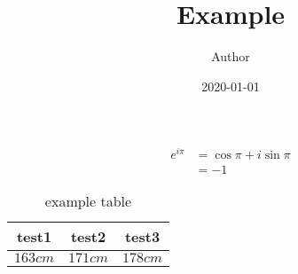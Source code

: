 \documentclass[a4paper,11pt,xelatex,ja=standard]{bxjsarticle}
\title{Example}
\author{Author}
\date{2020-01-01}
\begin{document}
\maketitle
\begin{align}
e^{i\pi} &= \cos{\pi} + i\sin{\pi}\\
&=-1
\end{align}
\begin{table}[hbtp]
\centering
\caption{example table}
\begin{tabular}{ccc}
\hline
test1 & test2 & test3 \\
\hline \hline
$\si{163}{cm}$ & $\si{171}{cm}$ & $\si{178}{cm}$ \\
\hline
\end{tabular}
\end{table}
\end{document}
